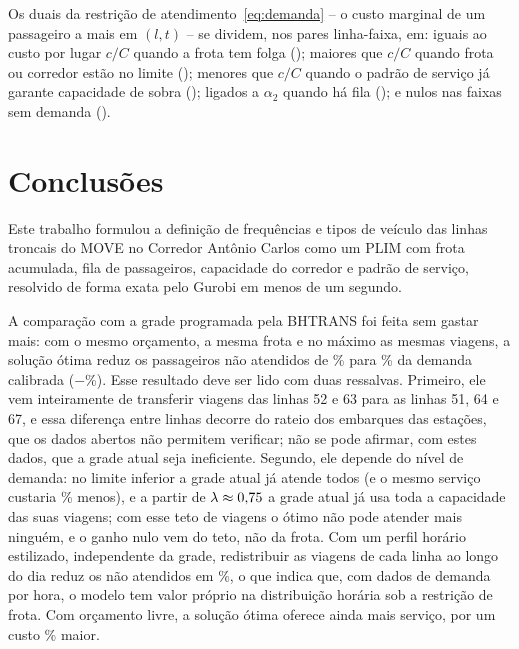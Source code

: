 \documentclass[11pt,a4paper]{article}
\newcommand{\tabela}[1]{\resizebox{\ifdim\width>\textwidth\textwidth\else\width\fi}{!}{}}
\begin{document}
\begin{table}[htbp]
\centering
\caption{Restrições de frota e de corredor com valor marginal positivo, e validação no PLIM.}
\label{tab:duais}
\small
\tabela{tabelas/duais_frota.tex}
\end{table}

Os duais da restrição de atendimento~\eqref{eq:demanda} -- o custo marginal de
um passageiro a mais em $(l,t)$ -- se dividem, nos \nPares{} pares
linha-faixa, em: iguais ao custo por lugar $c/C$ quando a frota tem folga
(\regimeFolga{}); maiores que $c/C$ quando frota ou corredor estão no limite
(\regimeLimite{}); menores que $c/C$ quando o padrão de serviço já garante
capacidade de sobra (\regimeSobra{}); ligados a $\alpha_2$ quando há fila
(\regimeFila{}); e nulos nas faixas sem demanda (\regimeSemDemanda{}).

\section{Conclusões}\label{sec:conclusao}

Este trabalho formulou a definição de frequências e tipos de veículo das linhas
troncais do MOVE no Corredor Antônio Carlos como um PLIM com frota acumulada,
fila de passageiros, capacidade do corredor e padrão de serviço, resolvido de
forma exata pelo Gurobi em menos de um segundo.

A comparação com a grade programada pela BHTRANS foi feita sem gastar mais: com
o mesmo orçamento, a mesma frota e no máximo as mesmas viagens, a solução ótima
reduz os passageiros não atendidos de \moPctGTFS\% para \moPctOtimo\% da demanda
calibrada ($-$\moReducaoPerda\%). Esse resultado deve ser lido com duas ressalvas. Primeiro,
ele vem inteiramente de transferir viagens das linhas 52 e 63 para as linhas 51,
64 e 67, e essa diferença entre linhas decorre do rateio dos embarques das
estações, que os dados abertos não permitem verificar; não se pode afirmar, com
estes dados, que a grade atual seja ineficiente. Segundo, ele depende do nível
de demanda: no limite inferior a grade atual já atende todos (e o mesmo serviço
custaria \moEconomiaLambdaZero\% menos), e a partir de
$\lambda\approx0{,}75$ a grade atual já usa toda a capacidade das
suas \viagensGTFS{} viagens; com esse teto de viagens o ótimo não pode atender
mais ninguém, e o ganho nulo vem do teto, não da frota. Com um perfil horário
estilizado, independente da grade, redistribuir as viagens de cada linha ao
longo do dia reduz os não atendidos em \moReducaoTipicoFixa\%, o que indica que,
com dados de demanda por hora, o modelo tem valor próprio na distribuição
horária sob a restrição de frota. Com orçamento livre, a solução ótima oferece
ainda mais serviço, por um custo \variacaoCusto\% maior.
\end{document}
